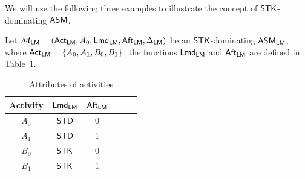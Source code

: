 \begin{example}
	We will use the following three examples to illustrate the concept of $\mathsf{STK}$-dominating $\textsf{ASM}$. 

Let ${\mathcal{M} }_{\textsf{LM}}=({\sf Act}_{\textsf{LM}},A_0,{\sf Lmd}_{\textsf{LM}},{\sf Aft}_{\textsf{LM}},\Delta_{\textsf{LM}})$ be an $\mathsf{STK}$-dominating $\textsf{ASM}_\textsf{LM}$, where ${\sf Act}_{\textsf{LM}} = \{A_0, A_1,B_0,B_1\}$, the functions ${\sf Lmd}_{\textsf{LM}}$ and ${\sf Aft}_{\textsf{LM}}$ are defined in Table~\ref{tab-attribute-stk}.
\begin{table}[htbp]
	\begin{center}
	\begin{tabular}{|c|c|c|c|c|c|}
	\hline
	Activity & ${\sf Lmd}_{\textsf{LM}}$ & ${\sf Aft}_{\textsf{LM}}$\\
	\hline
	$A_0$ & $\mathsf{STD}$ & 0\\
	\hline
	$A_1$ & $\mathsf{STD}$ & 1 \\
	\hline
	$B_0$ & $\mathsf{STK}$ & 0 \\
	\hline
	$B_1$ & $\mathsf{STK}$ & 1 \\
	\hline
	\end{tabular}
	\caption{Attributes of activities}
	\label{tab-attribute-stk}
	\end{center}
\end{table}
		

\end{example}
